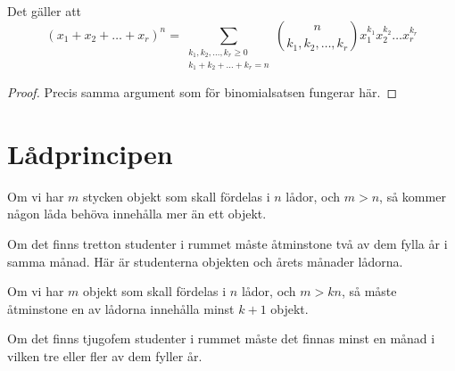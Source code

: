 \documentclass[nobib]{tufte-handout}
\begin{document}
\begin{theorem}[Multinomialsatsen]
  Det gäller att
  $$(x_1 + x_2 + \ldots + x_r)^n = \sum_{\substack{k_1, k_2, \ldots, k_r \geq 0\\k_1 + k_2 + \ldots + k_r = n}} \binom{n}{k_1, k_2, \ldots, k_r} x_1^{k_1} x_2^{k_2} \ldots x_r^{k_r}$$

  \begin{proof}
    Precis samma argument som för binomialsatsen fungerar här.
  \end{proof}
\end{theorem}

\section{Lådprincipen}

\begin{theorem}[Lådprincipen]
  Om vi har $m$ stycken objekt som skall fördelas i $n$ lådor, och $m > n$, så kommer någon låda behöva innehålla mer än ett objekt.
\end{theorem}

\begin{example}
  Om det finns tretton studenter i rummet måste åtminstone två av dem fylla år i samma månad. Här är studenterna objekten och årets månader lådorna.
\end{example}

\begin{theorem}
  Om vi har $m$ objekt som skall fördelas i $n$ lådor, och $m > kn$, så måste åtminstone en av lådorna innehålla minst $k+1$ objekt.
\end{theorem}

\begin{example}
  Om det finns tjugofem studenter i rummet måste det finnas minst en månad i vilken tre eller fler av dem fyller år.
\end{example}
\end{document}
